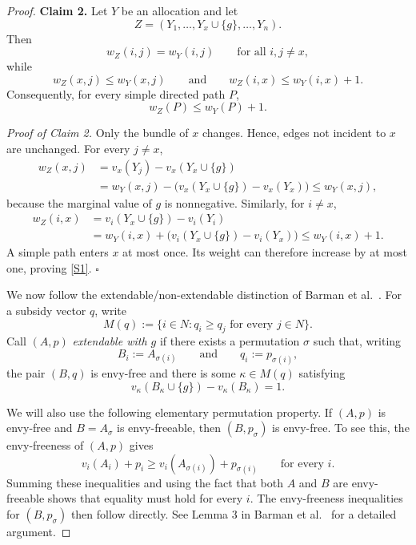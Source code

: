 \begin{proof}
\medskip
\noindent
\textbf{Claim 2.}
Let $Y$ be an allocation and let
\[
Z=(Y_1,\ldots,Y_x\cup\{g\},\ldots,Y_n).
\]
Then
\[
w_Z(i,j)=w_Y(i,j)
\qquad
\text{for all }i,j\neq x,
\]
while
\[
w_Z(x,j)\leq w_Y(x,j)
\qquad\text{and}\qquad
w_Z(i,x)\leq w_Y(i,x)+1.
\]
Consequently, for every simple directed path $P$,
\begin{equation}\label{S1}
    w_Z(P)\leq w_Y(P)+1.
\end{equation}

\smallskip
\noindent
\emph{Proof of Claim 2.}
Only the bundle of $x$ changes. Hence, edges not incident to $x$ are unchanged. For every $j\neq x$,
\[
\begin{aligned}
w_Z(x,j)
&=v_x(Y_j)-v_x(Y_x\cup\{g\})\\
&=w_Y(x,j)
-\bigl(v_x(Y_x\cup\{g\})-v_x(Y_x)\bigr)
\leq w_Y(x,j),
\end{aligned}
\]
because the marginal value of $g$ is nonnegative. Similarly, for
$i\neq x$,
\[
\begin{aligned}
w_Z(i,x)
&=v_i(Y_x\cup\{g\})-v_i(Y_i)\\
&=w_Y(i,x)
+\bigl(v_i(Y_x\cup\{g\})-v_i(Y_x)\bigr)
\leq w_Y(i,x)+1.
\end{aligned}
\]
A simple path enters $x$ at most once. Its weight can therefore increase by at most one, proving \eqref{S1}.
\hfill$\square$

\medskip
We now follow the extendable/non-extendable distinction of Barman et al.~\cite{BKNS22}. For a subsidy vector $q$, write
\[
M(q):=\{i\in N:q_i\geq q_j\text{ for every }j\in N\}.
\]
Call $(A,p)$ \emph{extendable with $g$} if there exists a permutation $\sigma$ such that, writing
\[
B_i:=A_{\sigma(i)}
\qquad\text{and}\qquad
q_i:=p_{\sigma(i)},
\]
the pair $(B,q)$ is envy-free and there is some
$\kappa\in M(q)$ satisfying
\begin{equation}\label{S2}
 v_\kappa(B_\kappa\cup\{g\})-v_\kappa(B_\kappa)=1.
\end{equation}


We will also use the following elementary permutation property. If $(A,p)$ is envy-free and $B=A_\sigma$ is envy-freeable, then $(B,p_\sigma)$ is envy-free. To see this, the envy-freeness of
$(A,p)$ gives
\[
v_i(A_i)+p_i
\geq
v_i(A_{\sigma(i)})+p_{\sigma(i)}
\qquad\text{for every }i.
\]
Summing these inequalities and using the fact that both $A$ and $B$ are envy-freeable shows that equality must hold for every $i$. The envy-freeness inequalities for $(B,p_\sigma)$ then follow directly. See Lemma 3 in Barman et al.~\cite{BKNS22} for a detailed argument.


\end{proof}

